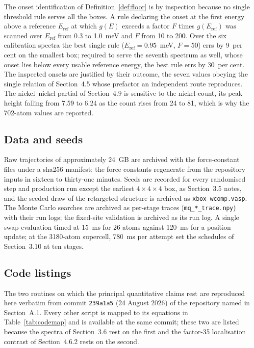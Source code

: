 The onset identification of Definition~\ref{def:floor} is by inspection
because no single threshold rule serves all the boxes. A rule declaring
the onset at the first energy above a reference $E_{\mathrm{ref}}$ at
which $g(E)$ exceeds a factor $F$ times $g(E_{\mathrm{ref}})$ was scanned
over $E_{\mathrm{ref}}$ from 0.3 to 1.0~meV and $F$ from 10 to 200. Over
the six calibration spectra the best single rule
($E_{\mathrm{ref}}=0.95$~meV, $F=50$) errs by 9~per cent on the smallest
box; required to serve the seventh spectrum as well, whose onset lies
below every usable reference energy, the best rule errs by 30~per cent.
The inspected onsets are justified by their outcome, the seven values
obeying the single relation of Section~4.5 whose prefactor an independent
route reproduces. The nickel--nickel partial of Section~4.9 is sensitive to the nickel count, its peak height falling from 7.59 to 6.24 as the count rises from 24 to 81, which is why the 702-atom values are reported.

\subsection{Data and seeds}
Raw trajectories of approximately 24~GB are archived with the
force-constant files under a sha256 manifest; the force constants
regenerate from the repository inputs in sixteen to thirty-one minutes.
Seeds are recorded for every randomised step and production run except
the earliest $4\times4\times4$ box, as Section~3.5 notes, and the seeded
draw of the retargeted structure is archived as
\texttt{xbox\_wcomp.vasp}. The Monte Carlo searches are archived as
per-stage traces (\texttt{mq\_*\_trace.npy}) with their run logs; the
fixed-site validation is archived as its run log. A single swap evaluation timed at 15~ms for 26 atoms against 120~ms for a
position update; at the 3180-atom supercell, 780~ms per attempt set the
schedules of Section~3.10 at ten stages.

\subsection{Code listings}
\label{app:code}

The two routines on which the principal quantitative claims rest are
reproduced here verbatim from commit \texttt{239a1a5} (24 August 2026) of the
repository named in Section~A.1. Every other script is mapped to its equations
in Table~\ref{tab:codemap} and is available at the same commit; these two are
listed because the spectra of Section~3.6 rest on the first and the factor-35
localisation contrast of Section~4.6.2 rests on the second.


